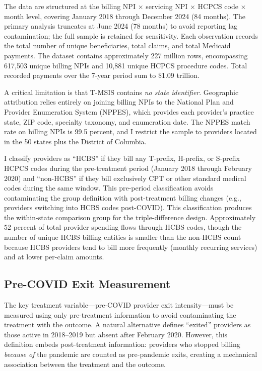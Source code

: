 \documentclass[12pt]{article}
\begin{document}
The data are structured at the billing NPI $\times$ servicing NPI $\times$ HCPCS code $\times$ month level, covering January 2018 through December 2024 (84 months). The primary analysis truncates at June 2024 (78 months) to avoid reporting lag contamination; the full sample is retained for sensitivity. Each observation records the total number of unique beneficiaries, total claims, and total Medicaid payments. The dataset contains approximately 227 million rows, encompassing 617,503 unique billing NPIs and 10,881 unique HCPCS procedure codes. Total recorded payments over the 7-year period sum to \$1.09 trillion.

A critical limitation is that T-MSIS contains \emph{no state identifier}. Geographic attribution relies entirely on joining billing NPIs to the National Plan and Provider Enumeration System (NPPES), which provides each provider's practice state, ZIP code, specialty taxonomy, and enumeration date. The NPPES match rate on billing NPIs is 99.5 percent, and I restrict the sample to providers located in the 50 states plus the District of Columbia.

I classify providers as ``HCBS'' if they bill any T-prefix, H-prefix, or S-prefix HCPCS codes during the pre-treatment period (January 2018 through February 2020) and ``non-HCBS'' if they bill exclusively CPT or other standard medical codes during the same window. This pre-period classification avoids contaminating the group definition with post-treatment billing changes (e.g., providers switching into HCBS codes post-COVID). This classification produces the within-state comparison group for the triple-difference design. Approximately 52 percent of total provider spending flows through HCBS codes, though the number of unique HCBS billing entities is smaller than the non-HCBS count because HCBS providers tend to bill more frequently (monthly recurring services) and at lower per-claim amounts.

\subsection{Pre-COVID Exit Measurement}

The key treatment variable---pre-COVID provider exit intensity---must be measured using only pre-treatment information to avoid contaminating the treatment with the outcome. A natural alternative defines ``exited'' providers as those active in 2018--2019 but absent after February 2020. However, this definition embeds post-treatment information: providers who stopped billing \textit{because of} the pandemic are counted as pre-pandemic exits, creating a mechanical association between the treatment and the outcome.
\end{document}
